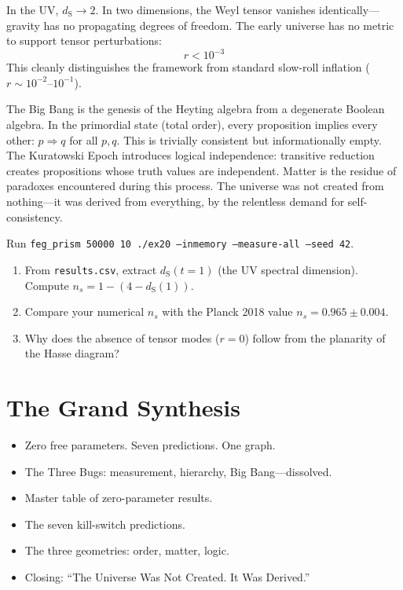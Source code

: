 \documentclass[11pt, a4paper, openany]{book}
\newcommand{\dS}{d_{\mathrm{S}}}
\newenvironment{introduction}[1][Modulo Overview]{%
  \begin{tcolorbox}[
    enhanced,colback=structure!5,colframe=structure,
    colbacktitle=structure,coltitle=white,
    fonttitle=\small\bfseries,title={#1},
    arc=2pt,boxrule=0.7pt,
    left=8pt,right=8pt,top=6pt,bottom=6pt,
    before skip=12pt,after skip=12pt
  ]\itshape\begin{itemize}[leftmargin=*,itemsep=2pt,parsep=0pt]
}{%
  \end{itemize}\end{tcolorbox}
}
\begin{document}
In the UV, $\dS \to 2$. In two dimensions, the Weyl tensor vanishes identically---gravity has no propagating degrees of freedom. The early universe has no metric to support tensor perturbations:
\[
  r < 10^{-3}
\]
This cleanly distinguishes the framework from standard slow-roll inflation ($r \sim 10^{-2}$--$10^{-1}$).

\begin{logicalreading}
The Big Bang is the genesis of the Heyting algebra from a degenerate Boolean algebra. In the primordial state (total order), every proposition implies every other: $p \Rightarrow q$ for all $p, q$. This is trivially consistent but informationally empty. The Kuratowski Epoch introduces logical independence: transitive reduction creates propositions whose truth values are independent. Matter is the residue of paradoxes encountered during this process. The universe was not created from nothing---it was derived from everything, by the relentless demand for self-consistency.
\end{logicalreading}

\begin{simulation}
Run \texttt{feg\_prism 50000 10 ./ex20 --inmemory --measure-all --seed 42}.
\begin{enumerate}
\item From \texttt{results.csv}, extract $\dS(t{=}1)$ (the UV spectral dimension). Compute $n_s = 1 - (4 - \dS(1))$.
\item Compare your numerical $n_s$ with the Planck 2018 value $n_s = 0.965 \pm 0.004$.
\item Why does the absence of tensor modes ($r = 0$) follow from the planarity of the Hasse diagram?
\end{enumerate}
\end{simulation}


\chapter{The Grand Synthesis}\label{ch:synthesis}

\begin{introduction}
  \item Zero free parameters. Seven predictions. One graph.
  \item The Three Bugs: measurement, hierarchy, Big Bang---dissolved.
  \item Master table of zero-parameter results.
  \item The seven kill-switch predictions.
  \item The three geometries: order, matter, logic.
  \item Closing: ``The Universe Was Not Created. It Was Derived.''
\end{introduction}
\end{document}
